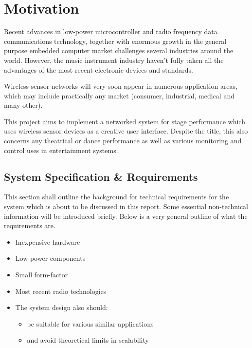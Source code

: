 \section{Motivation}

  Recent advances in low-power microcontroller and radio frequency data communications
 technology, together with enormous growth in the general purpose embedded computer
 market challenges several industries around the world. However, the music instrument
 industry haven't fully taken all the advantages of the most recent electronic devices
 and standards.
 
 Wireless sensor networks will very soon appear in numerous application areas,
 which may include practically any market (consumer, industrial, medical and many other).
 
 This project aims to implement a networked system for stage performance which uses
 wireless sensor devices as a creative user interface. Despite the title, this also
 concerns any theatrical or dance performance as well as various monitoring and
 control uses in entertainment systems.

\subsection{System Specification \& Requirements}

   This section shall outline the background for technical
 requirements for the system which is about to be discussed
 in this report. Some essential non-technical information
 will be introduced briefly. Below is a very general outline
 of what the requirements are.

  \begin{itemize} \em
	  \item	Inexpensive hardware
	  \item	Low-power components
	  \item	Small form-factor
	  \item	Most recent radio technologies

  \item The system design also should:

  \begin{itemize}
	  \item	be suitable for various similar applications
	  \item	and avoid theoretical limits in scalability 

  \end{itemize}
  \end{itemize}


